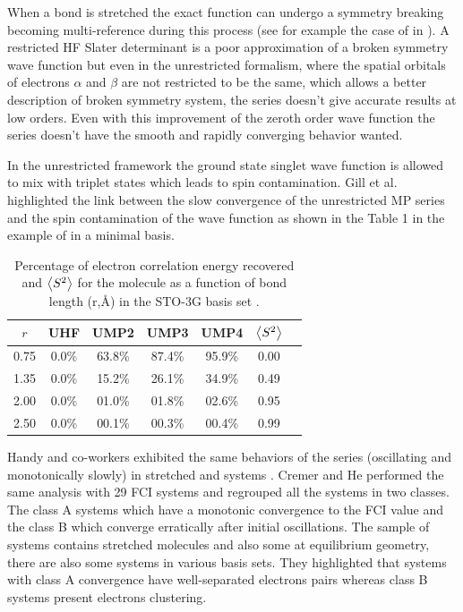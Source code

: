 \documentclass[11pt,a4paper]{article}
\begin{document}
{When a bond is stretched the exact function can undergo a symmetry breaking becoming multi-reference during this process (see for example the case of  in \cite{SzaboBook}). A restricted HF Slater determinant is a poor approximation of a broken symmetry wave function but even in the unrestricted formalism, where the spatial orbitals of electrons $\alpha$ and $\beta$ are not restricted to be the same\cite{Fukutome_1981}, which allows a better description of broken symmetry system, the series doesn't give accurate results at low orders. Even with this improvement of the zeroth order wave function the series doesn't have the smooth and rapidly converging behavior wanted. 

In the unrestricted framework the ground state singlet wave function is allowed to mix with triplet states which leads to spin contamination. Gill et al. highlighted the link between the slow convergence of the unrestricted MP series and the spin contamination of the wave function as shown in the Table 1 in the example of  in a minimal basis.

\begin{table}[h!]
    \centering
    \begin{tabular}{c c c c c c c}
\hline
 $r$ & UHF & UMP2 & UMP3 & UMP4 & $\expval{S^2}$ \\
\hline
0.75 & 0.0\% & 63.8\% & 87.4\% & 95.9\% & 0.00\\
1.35 & 0.0\% & 15.2\% & 26.1\% & 34.9\% & 0.49\\
2.00 & 0.0\% & 01.0\% & 01.8\% & 02.6\% & 0.95\\
2.50 & 0.0\% & 00.1\% & 00.3\% & 00.4\% & 0.99\\
\hline
\end{tabular}
    \caption{\centering Percentage of electron correlation energy recovered and $\expval{S^2}$ for the  molecule as a function of bond length (r,\si{\angstrom}) in the STO-3G basis set \cite{Gill_1988}.}
    \label{tab:my_label}
\end{table}

Handy and co-workers exhibited the same behaviors of the series (oscillating and monotonically slowly) in stretched  and  systems \cite{Handy_1985}. Cremer and He performed the same analysis with 29 FCI systems \cite{Cremer_1996} and regrouped all the systems in two classes. The class A systems which have a monotonic convergence to the FCI value and the class B which converge erratically after initial oscillations. The sample of systems contains stretched molecules and also some at equilibrium geometry, there are also some systems in various basis sets. They highlighted that systems with class A convergence have well-separated electrons pairs whereas class B systems present electrons clustering.

}
\end{document}
